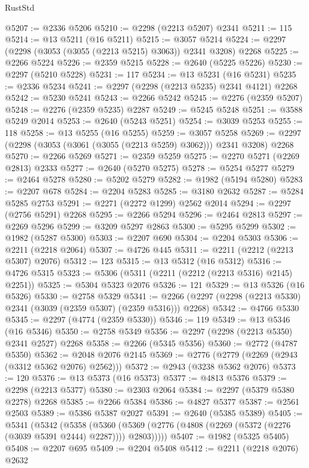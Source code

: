 \begin{lexlean}{RustStd}
\begin{coremodule}
@5207 := @2336 @5206
@5210 := @2298 (@2213 @5207) @2341
@5211 := 115
@5214 := @13 @5211 (@16 @5211)
@5215 := @3057 @5214
@5224 := @2297 (@2298 (@3053 (@3055 (@2213 @5215) @3063)) @2341 @3208) @2268
@5225 := @2266 @5224
@5226 := @2359 @5215
@5228 := @2640 (@5225 @5226)
@5230 := @2297 (@5210 @5228)
@5231 := 117
@5234 := @13 @5231 (@16 @5231)
@5235 := @2336 @5234
@5241 := @2297 (@2298 (@2213 @5235) @2341 @4121) @2268
@5242 := @5230 @5241
@5243 := @2266 @5242
@5245 := @2276 (@2359 @5207)
@5248 := @2276 (@2359 @5235) @2287
@5249 := @5245 @5248
@5251 := @3588 @5249 @2014
@5253 := @2640 (@5243 @5251)
@5254 := @3039 @5253
@5255 := 118
@5258 := @13 @5255 (@16 @5255)
@5259 := @3057 @5258
@5269 := @2297 (@2298 (@3053 (@3061 (@3055 (@2213 @5259) @3062))) @2341 @3208) @2268
@5270 := @2266 @5269
@5271 := @2359 @5259
@5275 := @2270 @5271 (@2269 @2813) @2333
@5277 := @2640 (@5270 @5275)
@5278 := @5254 @5277
@5279 := @2464 @5278
@5280 := @5202 @5279
@5282 := @1982 (@5194 @5280)
@5283 := @2207 @678
@5284 := @2204 @5283
@5285 := @3180 @2632
@5287 := @5284 @5285 @2753
@5291 := @2271 (@2272 @1299) @2562 @2014
@5294 := @2297 (@2756 @5291) @2268
@5295 := @2266 @5294
@5296 := @2464 @2813
@5297 := @2269 @5296
@5299 := @3209 @5297 @2863
@5300 := @5295 @5299
@5302 := @1982 (@5287 @5300)
@5303 := @2207 @690
@5304 := @2204 @5303
@5306 := @2211 (@2218 @2064)
@5307 := @4726 @445
@5311 := @2211 (@2212 (@2213 @5307) @2076)
@5312 := 123
@5315 := @13 @5312 (@16 @5312)
@5316 := @4726 @5315
@5323 := @5306 (@5311 (@2211 (@2212 (@2213 @5316) @2145) @2251))
@5325 := @5304 @5323 @2076
@5326 := 121
@5329 := @13 @5326 (@16 @5326)
@5330 := @2758 @5329
@5341 := @2266 (@2297 (@2298 (@2213 @5330) @2341 (@3039 (@2359 @5307) (@2359 @5316))) @2268)
@5342 := @4766 @5330
@5345 := @2297 (@4774 (@2359 @5330))
@5346 := 119
@5349 := @13 @5346 (@16 @5346)
@5350 := @2758 @5349
@5356 := @2297 (@2298 (@2213 @5350) @2341 @2527) @2268
@5358 := @2266 (@5345 @5356)
@5360 := @2772 (@4787 @5350)
@5362 := @2048 @2076 @2145
@5369 := @2776 (@2779 (@2269 (@2943 (@3312 @5362 @2076) @2562)))
@5372 := @2943 (@3238 @5362 @2076)
@5373 := 120
@5376 := @13 @5373 (@16 @5373)
@5377 := @4813 @5376
@5379 := @2298 (@2213 @5377)
@5380 := @2303 @2064
@5384 := @2297 (@5379 @5380 @2278) @2268
@5385 := @2266 @5384
@5386 := @4827 @5377
@5387 := @2561 @2503
@5389 := @5386 @5387 @2027
@5391 := @2640 (@5385 @5389)
@5405 := @5341
    (@5342
      (@5358
        (@5360 (@5369 (@2776 (@4808 (@2269 (@5372 (@2276 (@3039 @5391 @2444) @2287)))) @2803)))))
@5407 := @1982 (@5325 @5405)
@5408 := @2207 @695
@5409 := @2204 @5408
@5412 := @2211 (@2218 @2076) @2632

\end{coremodule}
\end{lexlean}

